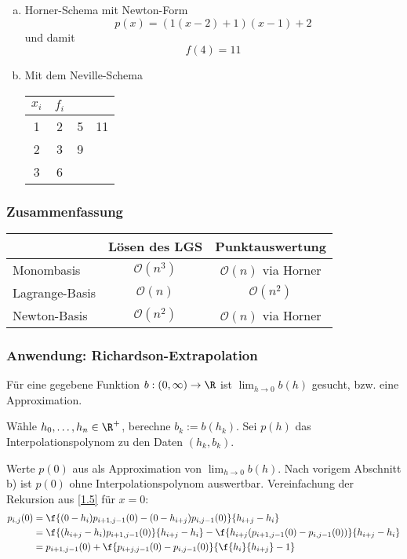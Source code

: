 \documentclass[11pt]{scrartcl}
\begin{document}
\begin{ex*}
	\begin{enumerate}[a)]
		\item 
			Horner-Schema mit Newton-Form
			\[
				p(x) = (1(x-2)+1)(x-1) +2
			\]
			und damit
			\[
				f(4) = 11
			\]
		\item
			Mit dem Neville-Schema
			\begin{tabular}{cccc}
				$x_i$ & $f_i$ &  & \\ \hline
				1 & 2 & 5 & 11\\
				2 & 3 & 9\\
				3 & 6
			\end{tabular}
	\end{enumerate}
\end{ex*}

\subsubsection{Zusammenfassung}

\begin{tabular}{l|c|c}
	 & Lösen des LGS & Punktauswertung\\ \hline
	 Monombasis  & $\mathcal O(n^3)$ & $\mathcal O(n)$ via Horner \\ \hline
	 Lagrange-Basis & $\mathcal O(n)$ & $\mathcal O(n^2)$ \\ \hline
	 Newton-Basis & $\mathcal O(n^2)$ & $\mathcal O(n)$ via Horner
\end{tabular}

\subsubsection{Anwendung: Richardson-Extrapolation}

Für eine gegebene Funktion $b:(0,\infty)\to \R$ ist $\lim_{h\to 0} b(h)$ gesucht, bzw. eine Approximation.

\begin{seg}[Ansatz:]
Wähle $h_0,\dotsc, h_n \in \R^+$, berechne $b_k := b(h_k)$.
Sei $p(h)$ das Interpolationspolynom zu den Daten $(h_k,b_k)$.

Werte $p(0)$ aus als Approximation von $\lim_{h\to 0} b(h)$.
Nach vorigem Abschnitt b) ist $p(0)$ ohne Interpolationspolynom auswertbar.
Vereinfachung der Rekursion aus \ref{1.5} für $x=0$:
\begin{align*}
	p_{i,j}(0) &= \f {(0-h_i)p_{i+1,j-1}(0) - (0-h_{i+j})p_{i,j-1}(0)}{h_{i+j}-h_i} \\
	&= \f {(h_{i+j}-h_i)p_{i+1,j-1}(0)}{h_{i+j}-h_i} - \f {h_{i+j}(p_{i+1,j-1}(0)-p_{i,j-1}(0))}{h_{i+j}-h_i}\\
	&= p_{i+1,j-1}(0) + \f {p_{i+j,j-1}(0) -p_{i,j-1}(0)}{\f {h_i}{h_{i+j}} - 1}
\end{align*}
\end{seg}
\end{document}
